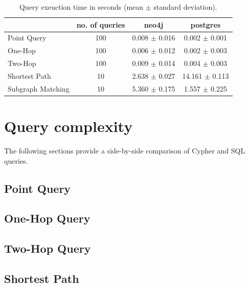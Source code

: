 \documentclass[11pt, a4paper,oneside,chapterprefix=false]{scrbook}
\begin{document}
\begin{table}[h]
	\begin{center}
		\begin{tabular}{ |l|c|c|c| }
			\hline
			& no. of queries & neo4j & postgres \\
			\hline
			Point Query & 100 & 0.008 $\pm$ 0.016 & 0.002 $\pm$ 0.001 \\
			One-Hop & 100 & 0.006 $\pm$ 0.012 &  0.002 $\pm$ 0.003 \\
			Two-Hop & 100 & 0.009 $\pm$ 0.014 &  0.004 $\pm$ 0.003 \\
			Shortest Path & 10 & 2.638 $\pm$ 0.027 & 14.161 $\pm$ 0.113 \\
			Subgraph Matching & 10 & 5.360 $\pm$ 0.175 & 1.557 $\pm$ 0.225 \\
			\hline
		\end{tabular}
		\caption{\label{table:performance} Query exeuction time in seconds (mean $\pm$ standard deviation).}
	\end{center}
\end{table}

\section{Query complexity}

The following sections provide a side-by-side comparison of Cypher and SQL queries.

\subsection{Point Query} \label{sec:result:point}


\subsection{One-Hop Query}\label{sec:result:one-hop}


\subsection{Two-Hop Query} \label{sec:result:two-hop}


\subsection{Shortest Path} \label{sec:result:shortest-path}

\end{document}
